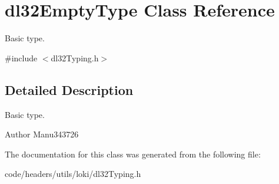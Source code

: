 \hypertarget{classdl32_empty_type}{\section{dl32\-Empty\-Type Class Reference}
\label{classdl32_empty_type}
}


Basic type.  




{\ttfamily \#include $<$dl32\-Typing.\-h$>$}



\subsection{Detailed Description}
Basic type. 

\begin{DoxyAuthor}{Author}
Manu343726 
\end{DoxyAuthor}


The documentation for this class was generated from the following file\-:\begin{DoxyCompactItemize}
\item 
code/headers/utils/loki/dl32\-Typing.\-h\end{DoxyCompactItemize}
